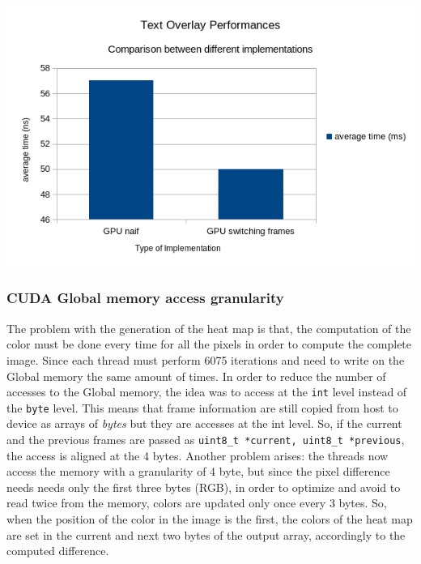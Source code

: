 \documentclass[paper=a4, fontsize=10pt]{scrartcl}	%
\begin{document}
	\begin{center}
		\includegraphics[width=0.6\linewidth]{images/heatmap/comp_heat_3}
	\end{center}
	
	
	\subsubsection{CUDA Global memory access granularity}
	The problem with the generation of the heat map is that, the computation of the color must be done every time for all the pixels in order to compute the complete image.\newline\newline
	Since each thread must perform 6075 iterations and need to write on the Global memory the same amount of times.
	In order to reduce the number of accesses to the Global memory, the idea was to access at the \texttt{int} level instead of the \texttt{byte} level. This means that frame information are still copied from host to device as arrays of \textit{bytes} but they are accesses at the int level. So, if the current and the previous frames are passed as \texttt{uint8\_t *current, uint8\_t *previous}, the access is aligned at the 4 bytes. 
	Another problem arises: the threads now access the memory with a granularity of 4 byte, but since the pixel difference needs needs only the first three bytes (RGB), in order to optimize and avoid to read twice from the memory, colors are updated only once every 3 bytes. So, when the position of the color in the image is the first, the colors of the heat map are set in the current and next two bytes of the output array, accordingly to the computed difference.
\end{document}

